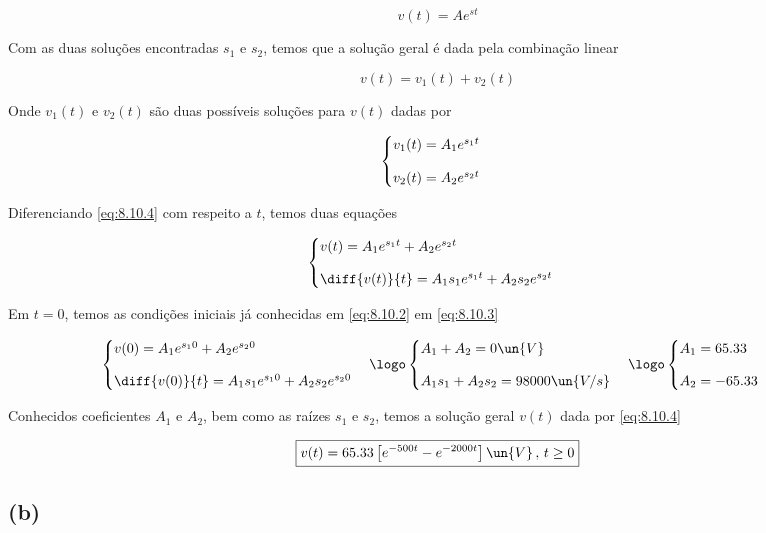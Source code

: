 \[ v(t) = Ae^{st}  \]

Com as duas soluções encontradas $s_1$ e $s_2$, temos que a solução geral é dada pela combinação linear

\begin{equation}\label{eq:8.10.4}
    v(t) = v_1(t) + v_2(t)
\end{equation}

Onde $v_1(t)$ e $v_2(t)$ são duas possíveis soluções para $v(t)$ dadas por  

\[ \begin{cases}
        v_1(t) = A_1e^{s_1t}  & \\
        \noalign{\vskip9pt}
        v_2(t) = A_2e^{s_2t}
    \end{cases}
\]

Diferenciando \eqref{eq:8.10.4} com respeito a $t$, temos duas equações

\[ \begin{cases}
        v(t) = A_1e^{s_1t} + A_2e^{s_2t} & \\
        \noalign{\vskip9pt}
        \diff{v(t)}{t} = A_1s_1e^{s_1t} + A_2s_2e^{s_2t}
    \end{cases}
\]

Em $t=0$, temos as condições iniciais já conhecidas em \eqref{eq:8.10.2} em \eqref{eq:8.10.3}

\[ \begin{cases}
        v(0) = A_1e^{s_10} + A_2e^{s_20} & \\
        \noalign{\vskip9pt}
        \diff{v(0)}{t} = A_1s_1e^{s_10} + A_2s_2e^{s_20}
    \end{cases}
    \logo
    \begin{cases}
        A_1 + A_2 = 0 \un{V} & \\
        \noalign{\vskip9pt}
        A_1s_1 + A_2s_2 = 98000 \un{V/s}
    \end{cases}
    \logo
    \begin{cases}
        A_1 =  65.33 & \\
        \noalign{\vskip9pt}
        A_2 = -65.33
    \end{cases}
\]

Conhecidos coeficientes $A_1$ e $A_2$, bem como as raízes $s_1$ e $s_2$, temos a solução geral $v(t)$ dada por  \eqref{eq:8.10.4}

\[ \boxed{v(t) = 65.33\left[e^{-500t} - e^{-2000t}\right] \un{V} \, , \, t \geq 0 }  \]

\subsection*{(b)}

